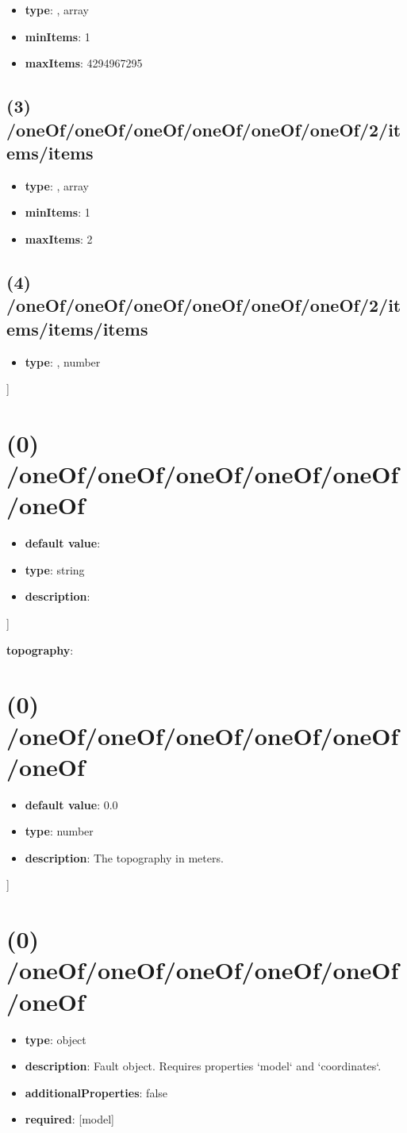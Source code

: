 \begin{itemize}[leftmargin=2em]\item {\bf type}: , array\item {\bf minItems}: 1
\item {\bf maxItems}: 4294967295
\end{itemize}\subsection{(3) /oneOf/oneOf/oneOf/oneOf/oneOf/oneOf/2/items/items}
\begin{itemize}[leftmargin=3em]\item {\bf type}: , array\item {\bf minItems}: 1
\item {\bf maxItems}: 2
\end{itemize}\subsection{(4) /oneOf/oneOf/oneOf/oneOf/oneOf/oneOf/2/items/items/items}
\begin{itemize}[leftmargin=4em]\item {\bf type}: , number\end{itemize}]\section{(0) /oneOf/oneOf/oneOf/oneOf/oneOf/oneOf}
\begin{itemize}[leftmargin=0em]\item {\bf default value}: 
\item {\bf type}: string
\item {\bf description}: 
\end{itemize}]\item {\bf topography}: \section{(0) /oneOf/oneOf/oneOf/oneOf/oneOf/oneOf}
\begin{itemize}[leftmargin=0em]\item {\bf default value}: 0.0
\item {\bf type}: number
\item {\bf description}: The topography in meters.
\end{itemize}]\section{(0) /oneOf/oneOf/oneOf/oneOf/oneOf/oneOf}
\begin{itemize}[leftmargin=0em]\item {\bf type}: object
\item {\bf description}: Fault object. Requires properties `model` and `coordinates`.
\item {\bf additionalProperties}: false
\item {\bf required}: [model]\end{itemize}
